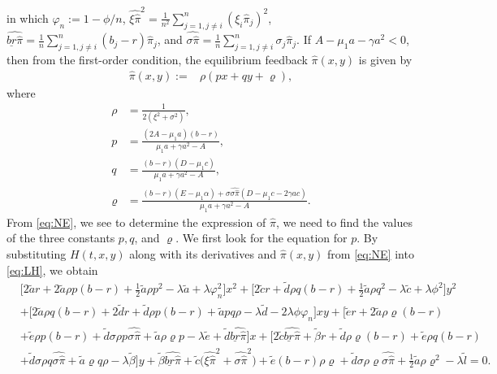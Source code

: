 \documentclass[11pt]{article}
\newcommand \hp {\widehat{\pi}}
\numberwithin{equation}{section}
\begin{document}
	in which $\varphi_{n} := 1 - \phi/n$, \(\widehat{\xi\widehat{\pi}}^2=\frac{1}{n^2}\sum_{j=1,j\neq i}^n(\xi_i\widehat{\pi}_j)^2\),  \(\widehat{\underline{br}\widehat{\pi}}=\frac{1}{n}\sum_{j=1,j\neq i}^n(b_j-r)\widehat{\pi}_j\), and \(\widehat{\sigma\widehat{\pi}}=\frac{1}{n}\sum_{j=1,j\neq i}^n\sigma_j\widehat{\pi}_j\). If \(A-\mu_1 a-\gamma a^2 <0\), then from the first-order condition, the equilibrium  feedback  $\widehat{\pi}(x,y)$ is given by
	\begin{align}
		\widehat{\pi}(x,y):=&\rho(p x+q y+\varrho),\label{eq:NE}
	\end{align}
	where
	\begin{align}
		\rho &= \frac{1}{2(\xi^2+\sigma^2)},\label{eq:rho}\\
		p  &= \frac{(2A -\mu_1a)(b-r) }{\mu_1 a +\gamma a ^2-A }, \label{eq:p} \\
		q  &= \frac{(b-r)(D -\mu_1c) }{\mu_1 a +\gamma a ^2-A }, \label{eq:q} \\
		\varrho  &= \frac{(b-r)(E-\mu_1 \alpha) +\sigma \widehat{\sigma\widehat{\pi}}(D-\mu_1 c - 2 \gamma a c)}{\mu_1 a +\gamma a ^2-A }. \label{eq:k}
        	\end{align}
	From \eqref{eq:NE},	we see to determine the expression of $\hp$, we need to find the values of the three constants $p, q$, and $\varrho$. We first look for the equation for \(p\). By substituting \(H(t,x,y)\) along with its derivatives and \(\widehat{\pi}(x,y)\) from \eqref{eq:NE} into \eqref{eq:LH}, we obtain
	\begin{align}		
		&	\Big[2 \tilde{a} r+2 \tilde{a}\rho p(b-r)+\frac{1}{2} \tilde{a}\rho p^2-\lambda  \tilde{a}+\lambda \varphi_n^2\Big]x^2+\Big[2 \tilde{c}r+ \tilde{d}\rho q(b-r)+\frac{1}{2} \tilde{a} \rho q^2 -\lambda  \tilde{c}+\lambda \phi^2\Big]y^2\\		
		&+\Big[2 \tilde{a}\rho q(b-r)+2 \tilde{d}r+ \tilde{d}\rho p(b-r)+ \tilde{a}pq\rho-\lambda  \tilde{d}-2\lambda \phi\varphi_n\Big]xy+\big[ \tilde{e}r+2 \tilde{a}\rho \varrho(b-r)\\		
		&+ \tilde{e}\rho p(b-r)+ \tilde{d}\sigma \rho p\widehat{\sigma\widehat{\pi}}+ \tilde{a}\rho \varrho p-\lambda  \tilde{e}+ \tilde{d}\widehat{\underline{br}\widehat{\pi}}\big]x+\big[2 \tilde{c}\widehat{\underline{br}\widehat{\pi}}		
		+ \tilde{\beta}r+ \tilde{d}\rho \varrho(b-r)+ \tilde{e}\rho q(b-r)\\		
		&+ \tilde{d}\sigma\rho q\widehat{\sigma\widehat{\pi}}+ \tilde{a}\varrho q\rho-\lambda  \tilde{\beta}\big]y+ \tilde{\beta}\widehat{\underline{br}\widehat{\pi}}+ \tilde{c}\Big(\widehat{ \xi\widehat{\pi}}^2+\widehat{\sigma\widehat{\pi}}^2\Big)+ \tilde{e}(b-r)\rho \varrho+ \tilde{d}\sigma \rho \varrho \widehat{\sigma\widehat{\pi}}+\frac{1}{2} \tilde{a}\rho \varrho^2-\lambda  \tilde{l}=0.\label{eq:LH1}	
	\end{align}
\end{document}
